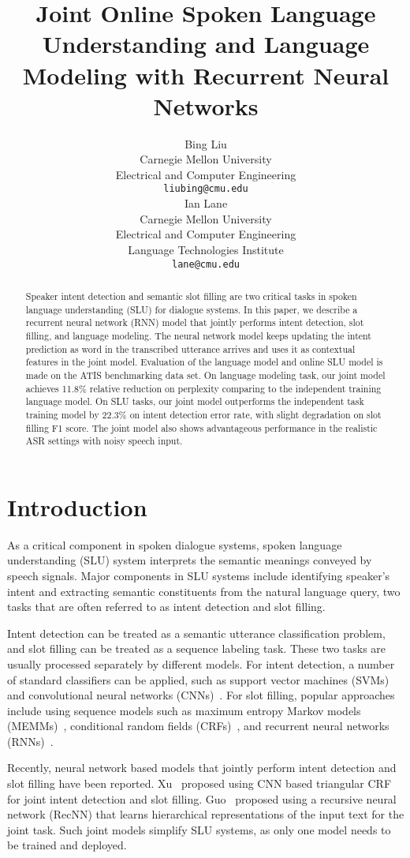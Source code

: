 \documentclass[11pt]{article}
\title{ Joint Online Spoken Language Understanding and Language Modeling with Recurrent Neural Networks}
\author{Bing Liu \\
  Carnegie Mellon University \\
  Electrical and Computer Engineering \\
  {\tt liubing@cmu.edu} \\\And
  Ian Lane \\
  Carnegie Mellon University \\
  Electrical and Computer Engineering \\
  Language Technologies Institute \\
  {\tt lane@cmu.edu} \\}
\date{}
\begin{document}
\maketitle
\begin{abstract}
    Speaker intent detection and semantic slot filling are two critical tasks in spoken language understanding (SLU) for dialogue systems. In this paper, we describe a recurrent neural network (RNN) model that jointly performs intent detection, slot filling, and language modeling. The neural network model keeps updating the intent prediction as word in the transcribed utterance arrives and uses it as contextual features in the joint model. Evaluation of the language model and online SLU model is made on the ATIS benchmarking data set. On language modeling task, our joint model achieves 11.8\% relative reduction on perplexity comparing to the independent training language model. On SLU tasks, our joint model outperforms the independent task training model by 22.3\% on intent detection error rate, with slight degradation on slot filling F1 score. The joint model also shows advantageous performance in the realistic ASR settings with noisy speech input.
\end{abstract}

\section{Introduction}
    As a critical component in spoken dialogue systems, spoken language understanding (SLU) system interprets the semantic meanings conveyed by speech signals. Major components in SLU systems include identifying speaker's intent and extracting semantic constituents from the natural language query, two tasks that are often referred to as intent detection and slot filling. 
    
    Intent detection can be treated as a semantic utterance classification problem, and slot filling can be treated as a sequence labeling task. These two tasks are usually processed separately by different models. For intent detection, a number of standard classifiers can be applied, such as support vector machines (SVMs)~\cite{haffner:03} and convolutional neural networks (CNNs)~\cite{xu:13}. For slot filling, popular approaches include using sequence models such as maximum entropy Markov models (MEMMs)~\cite{mccallum:00}, conditional random fields (CRFs)~\cite{raymond:07}, and recurrent neural networks (RNNs)~\cite{yao:14,mesnil:15}. 
    
    Recently, neural network based models that jointly perform intent detection and slot filling have been reported. Xu~ proposed using CNN based triangular CRF for joint intent detection and slot filling. Guo~ proposed using a recursive neural network (RecNN) that learns hierarchical representations of the input text for the joint task. Such joint models simplify SLU systems, as only one model needs to be trained and deployed. 
    
\end{document}
